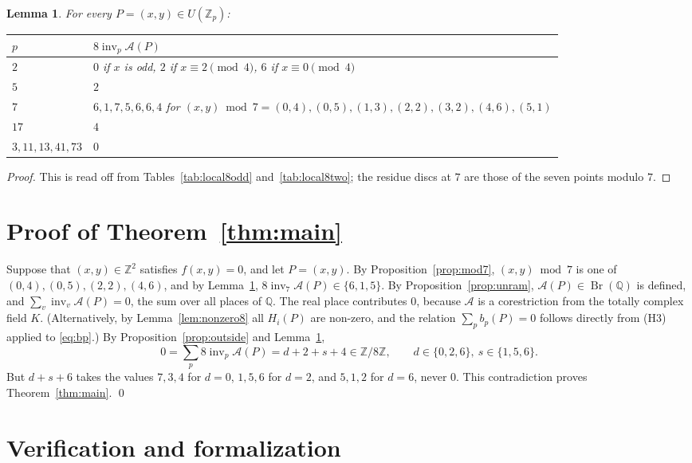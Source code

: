 \documentclass[11pt]{article}
\newtheorem{lemma}[theorem]{Lemma}
\newcommand{\Z}{\mathbb{Z}}
\newcommand{\Q}{\mathbb{Q}}
\newcommand{\Br}{\operatorname{Br}}
\newcommand{\inv}{\operatorname{inv}}
\begin{document}
\begin{lemma}\label{lem:local8}
For every $P=(x,y)\in U(\Z_p)$:
\begin{center}
\renewcommand{\arraystretch}{1.15}
\begin{tabular}{@{}ll@{}}
\toprule
$p$ & $8\inv_p\mathcal A(P)$\\
\midrule
$2$ & $0$ if $x$ is odd, $2$ if $x\equiv2\pmod4$, $6$ if $x\equiv0\pmod4$\\
$5$ & $2$\\
$7$ & $6,1,7,5,6,6,4$ for $(x,y)\bmod7=(0,4),(0,5),(1,3),(2,2),(3,2),(4,6),(5,1)$\\
$17$ & $4$\\
$3,11,13,41,73$ & $0$\\
\bottomrule
\end{tabular}
\end{center}
\end{lemma}

\begin{proof}
This is read off from Tables~\ref{tab:local8odd} and~\ref{tab:local8two}; the residue discs at $7$ are those of the seven points modulo $7$.
\end{proof}

\section{Proof of Theorem~\ref{thm:main}}\label{sec:proof}

Suppose that $(x,y)\in\Z^2$ satisfies $f(x,y)=0$, and let $P=(x,y)$. By Proposition~\ref{prop:mod7}, $(x,y)\bmod7$ is one of $(0,4),(0,5),(2,2),(4,6)$, and by Lemma~\ref{lem:local8}, $8\inv_7\mathcal A(P)\in\{6,1,5\}$. By Proposition~\ref{prop:unram}, $\mathcal A(P)\in\Br(\Q)$ is defined, and $\sum_v\inv_v\mathcal A(P)=0$, the sum over all places of $\Q$. The real place contributes $0$, because $\mathcal A$ is a corestriction from the totally complex field $K$. (Alternatively, by Lemma~\ref{lem:nonzero8} all $H_i(P)$ are non-zero, and the relation $\sum_pb_p(P)=0$ follows directly from (H3) applied to \eqref{eq:bp}.) By Proposition~\ref{prop:outside} and Lemma~\ref{lem:local8},
\[
0=\sum_p8\inv_p\mathcal A(P)=d+2+s+4\in\Z/8\Z,\qquad d\in\{0,2,6\},\ s\in\{1,5,6\}.
\]
But $d+s+6$ takes the values $7,3,4$ for $d=0$, $1,5,6$ for $d=2$, and $5,1,2$ for $d=6$, never $0$. This contradiction proves Theorem~\ref{thm:main}. \qed

\section{Verification and formalization}\label{sec:lean}
\end{document}
